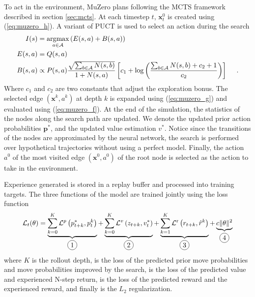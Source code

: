 To act in the environment, MuZero plans following the MCTS framework described in section \ref{sec:mcts}.
At each timestep $t$, $\mathbf{x}^0_t$ is created using (\ref{eq:muzero_h}).
A variant of PUCT is used to select an action during the search
\begin{align*}
    I(s)     & = \operatorname*{argmax}_{a \in \mathcal{A}} \left( E(s, a) + B(s, a) \right)  \\
    E(s, a)  & = Q(s, a)  \\
    B(s, a)  & \propto P(s, a) \frac{\sqrt{\sum_{b \in \mathcal{A}}N(s, b)}}{1+N(s, a)}\left[c_{1}+\log \left(\frac{\sum_{b \in \mathcal{A}}N(s, b)+c_{2}+1}{c_{2}}\right)\right] ~~~~.
\end{align*}
Where $c_1$ and $c_2$ are two constants that adjust the exploration bonus.
The selected edge $(\mathbf{x}^k, a^k)$ at depth $k$ is expanded using (\ref{eq:muzero_g}) and evaluated using (\ref{eq:muzero_f}).
At the end of the simulation, the statistics of the nodes along the search path are updated.
We denote the updated prior action probabilities $\mathbf{p}^*$, and the updated value estimation $v^*$.
Notice since the transitions of the nodes are approximated by the neural network, the search is performed over hypothetical trajectories without using a perfect model.
Finally, the action $a^0$ of the most visited edge $(\mathbf{x}^0, a^0)$ of the root node is selected as the action to take in the environment.

Experience generated is stored in a replay buffer and processed into training targets.
The three functions of the model are trained jointly using the loss function
\begin{equation}
    \mathcal{L}_{t}(\theta)=
    \underbrace{\sum_{k=0}^{K} \mathcal{L}^{p}\left(p^*_{t+k}, p_{t}^{k}\right)}_{\circled{1}}
    +
    \underbrace{\sum_{k=0}^{K} \mathcal{L}^{v}\left(z_{t+k}, v^*_{t}\right)}_{\circled{2}}
    +
    \underbrace{\sum_{k=1}^{K} \mathcal{L}^{\mathrm{r}}\left(r_{t+k}, \hat{r}^{k}\right)}_{\circled{3}}
    +
    \underbrace{c\|\theta\|^{2}}_{\circled{4}}
\end{equation}
where $K$ is the rollout depth,  is the loss of the predicted prior move probabilities and move probabilities improved by the search,  is the loss of the predicted value and experienced N-step return,
 is the loss of the predicted reward and the experienced reward, and finally  is the $L_2$ regularization.

